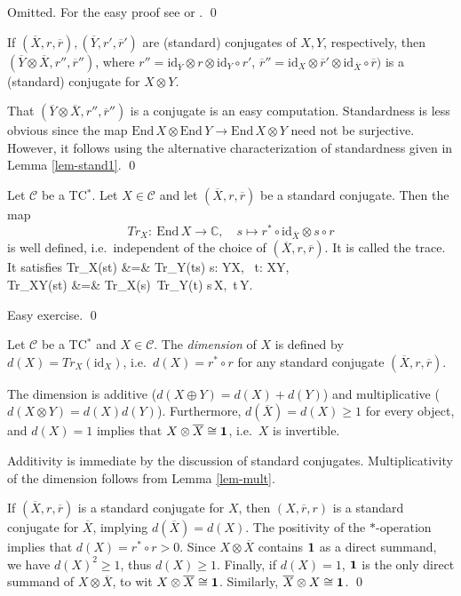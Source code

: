 \documentclass[11pt]{article}
\theoremstyle{definition}
\theoremstyle{definition}
\theoremstyle{remark}
\def\2#1{{\mathcal #1}}
\def\7#1{{\mathbb #1}}
\def\1#1{{\bf #1}}
\def\ol#1{{\overline #1}}
\newcommand{\End}{\mathrm{End}}
\newcommand{\mcirc}{\circ}
\newcommand{\rarr}{\rightarrow}
\def\id{\mathrm{id}}
\newcounter{bean}
\begin{document}
\prf Omitted. For the easy proof see \cite{LR} or \cite{mue06}.
\qed




\blemma \label{lem-mult}
If $(\ol{X},r,\ol{r}),(\ol{Y},r',\ol{r}')$ are (standard) conjugates of $X,Y$, respectively, then
$(\ol{Y}\otimes\ol{X}, r'',\ol{r}'')$, where $r''=\id_{\ol{Y}}\otimes r\otimes\id_Y\circ r'$,
$\ol{r}''=\id_X\otimes\ol{r'}\otimes\id_{\ol{X}}\circ\ol{r})$ 
is a (standard) conjugate for $X\otimes Y$.
\elemma

\prf That $(\ol{Y}\otimes\ol{X}, r'',\ol{r}'')$ is a conjugate is an easy computation. Standardness
is less obvious since the map $\End\,X\otimes\End\,Y\rarr\End\,X\otimes Y$ need not be
surjective. However, it follows using the alternative characterization of standardness given in
Lemma \ref{lem-stand1}.
\qed

\bprop \label{prop-trace} 
Let $\2C$ be a TC$^*$. Let
$X\in\2C$ and let $(\ol{X}, r,\ol{r})$ be a standard conjugate. Then the map
\[ Tr_X: \ \End\,X\rarr\7C,\quad s\mapsto r^*\mcirc \id_{\ol{X}}\otimes s\mcirc r \]
is well defined, i.e.\ independent of the choice of $(\ol{X}, r,\ol{r})$. It is called the trace. It
satisfies
\bean Tr_X(s\mcirc  t) &=& Tr_Y(t\mcirc  s) \quad\forall s: Y\rarr X, \ t: X\rarr Y,  \\
  Tr_{X\otimes Y}(s\otimes t) &=& Tr_X(s)\, Tr_Y(t) \quad\forall s\in\End\,X,\ t\in\End\,Y. 
\eean
\eprop

\prf Easy exercise. \qed

\bdefin {}
Let $\2C$ be a TC$^*$ and $X\in\2C$. The \emph{dimension} of $X$ is defined by
$d(X)=Tr_X(\id_X)$, i.e.\ $d(X)=r^*\circ r$ for any standard conjugate $(\ol{X},r,\ol{r})$. 
\edefin

\blemma \label{lem-dim}
The dimension is additive ($d(X\oplus Y)=d(X)+d(Y)$) and multiplicative ($d(X\otimes Y)=d(X)d(Y)$).
Furthermore, $d(\ol{X})=d(X)\ge 1$ for every object, and $d(X)=1$ implies that $X\otimes\ol{X}\cong\11$,
i.e.\ $X$ is invertible.
\elemma

\prf Additivity is immediate by the discussion of standard conjugates. Multiplicativity of the
dimension follows from Lemma \ref{lem-mult}.

If $(\ol{X},r,\ol{r})$ is a standard conjugate for $X$, then $(X,\ol{r},r)$ is a standard conjugate
for $\ol{X}$, implying $d(\ol{X})=d(X)$. The positivity of the $*$-operation implies that
$d(X)=r^*\circ r>0$. Since $X\otimes\ol{X}$ contains $\11$ as a direct summand, we have
$d(X)^2\ge 1$, thus $d(X)\ge 1$. Finally, if $d(X)=1$, $\11$ is the only direct summand of
$X\otimes\ol{X}$, to wit $X\otimes\ol{X}\cong\11$. Similarly, $\ol{X}\otimes X\cong\11$.
\qed
\end{document}
